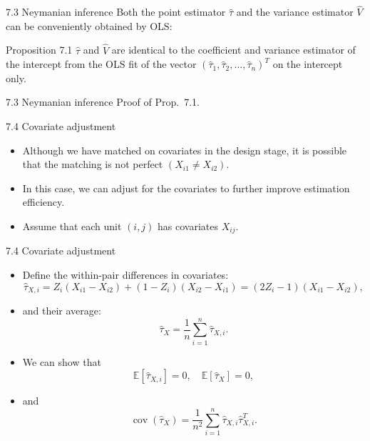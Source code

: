 \documentclass[aspectratio=169, 12pt]{beamer}
\begin{document}
\begin{frame}{7.3 Neymanian inference}
    Both the point estimator $\hat{\tau}$ and the variance estimator $\widehat{V}$ can be conveniently obtained by OLS:
    \begin{keybox}{Proposition 7.1}
        $\hat{\tau}$ and $\widehat{V}$ are identical to the coefficient and variance estimator of the intercept from the OLS fit of the vector $(\hat{\tau}_1,\hat{\tau}_2,\dots,\hat{\tau}_n)^T$ on the intercept only.
    \end{keybox}
\end{frame}

\begin{frame}{7.3 Neymanian inference}
    Proof of Prop.~7.1.
\end{frame}

\begin{frame}{7.4 Covariate adjustment}
    \begin{itemize}
        \item Although we have matched on covariates in the design stage, it is possible that the matching is not perfect $(X_{i1}\neq X_{i2})$.
        \item In this case, we can adjust for the covariates to further improve estimation efficiency.
        \item Assume that each unit $(i,j)$ has covariates $X_{ij}$.
    \end{itemize}
\end{frame}

\begin{frame}{7.4 Covariate adjustment}
    \begin{itemize}
        \item Define the within-pair differences in covariates: $$\hat{\tau}_{X,i} = Z_i(X_{i1}-X_{i2}) + (1-Z_i)(X_{i2}-X_{i1})=(2Z_i-1)(X_{i1}-X_{i2}),$$
        \item and their average:
        \[
        \hat{\tau}_X = \frac{1}{n}\sum_{i=1}^{n}\hat{\tau}_{X,i}.
        \]
        \item We can show that
        \[
        \mathbb{E}[\hat{\tau}_{X,i}]=0,\quad \mathbb{E}[\hat{\tau}_X]=0,
        \]
        \item and 
        \[
        \operatorname{cov}(\hat{\tau}_X)=\frac{1}{n^2}\sum_{i=1}^{n}\hat{\tau}_{X,i}\hat{\tau}_{X,i}^T.
        \]
    \end{itemize}
\end{frame}
\end{document}
